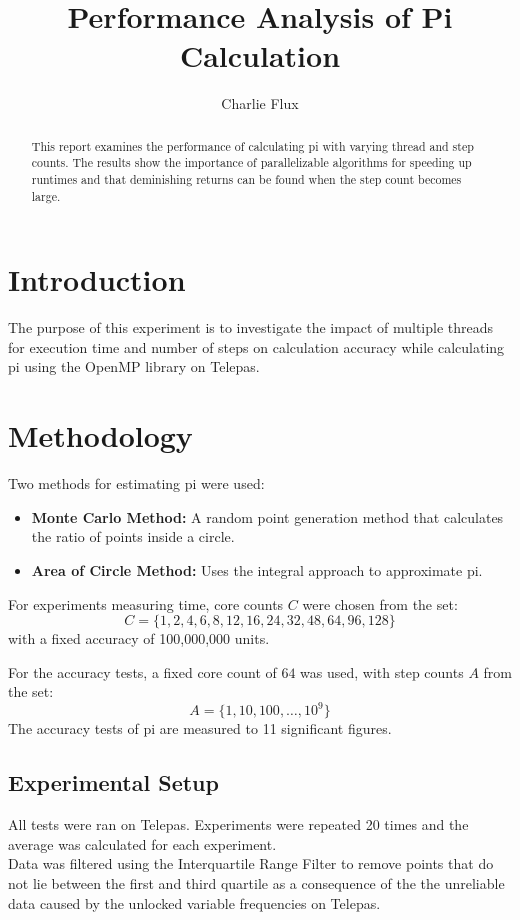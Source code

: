 \documentclass[conference]{IEEEtran}
\title{Performance Analysis of Pi Calculation}
\author{Charlie Flux}
\begin{document}
\maketitle

\begin{abstract}
This report examines the performance of calculating pi with varying thread and step counts.
The results show the importance of parallelizable algorithms for speeding up runtimes and that deminishing returns can be found when the step count becomes large.
\end{abstract}

\section{Introduction}
The purpose of this experiment is to investigate the impact of multiple threads for execution time and number of steps on calculation accuracy while calculating pi using the OpenMP library on Telepas.

\section{Methodology}
Two methods for estimating pi were used:
\begin{itemize}
    \item \textbf{Monte Carlo Method:} A random point generation method that calculates the ratio of points inside a circle.
    \item \textbf{Area of Circle Method:} Uses the integral approach to approximate pi.
\end{itemize}

For experiments measuring time, core counts \(C\) were chosen from the set:
    \[
    C = \{1, 2, 4, 6, 8, 12, 16, 24, 32, 48, 64, 96, 128\}
    \]
with a fixed accuracy of 100,000,000 units.

For the accuracy tests, a fixed core count of \(64\) was used, with step counts \(A\) from the set:
    \[
    A = \{1, 10, 100, \dots, 10^{9}\}
    \]
The accuracy tests of pi are measured to 11 significant figures.


\subsection{Experimental Setup}
All tests were ran on Telepas. Experiments were repeated 20 times and the average was calculated for each experiment. \\
Data was filtered using the Interquartile Range Filter to remove points that do not lie between the first and third quartile as a consequence of the the unreliable data caused by the unlocked variable frequencies on Telepas.
\end{document}

